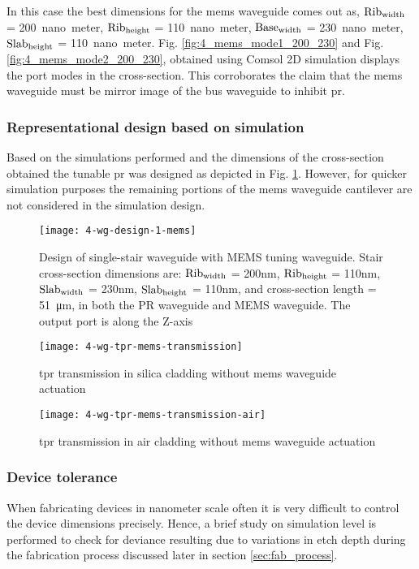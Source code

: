 \documentclass[../report.tex]{subfiles}
\begin{document}
In this case the best dimensions for the \gls{mems} waveguide comes out as, $\mathrm{Rib_{width}}$ = \SI{200}{nano meter}, $\mathrm{Rib_{height}}$ = \SI{110}{nano meter}, $\mathrm{Base_{width}}$ = \SI{230}{nano meter}, $\mathrm{Slab_{height}}$ = \SI{110}{nano meter}. Fig. \ref{fig:4_mems_mode1_200_230} and Fig. \ref{fig:4_mems_mode2_200_230}, obtained using Comsol 2D simulation displays the port modes in the cross-section. This corroborates the claim that the \gls{mems} waveguide must be mirror image of the bus waveguide to inhibit \gls{pr}.

\subsubsection{Representational design based on simulation}			
Based on the simulations performed and the dimensions of the cross-section obtained the tunable \gls{pr} was designed as depicted in Fig. \ref{fig:4_wg_design_1_mems}. However, for quicker simulation purposes the remaining portions of the \gls{mems} waveguide cantilever are not considered in the simulation design.  

\begin{figure}[H] %
	\centering
	\texttt{[image: 4-wg-design-1-mems]}
	\caption{Design of single-stair waveguide with MEMS tuning waveguide. Stair cross-section dimensions are: $\mathrm{Rib_{width}}$ = 200nm, $\mathrm{Rib_{height}}$ = 110nm, $\mathrm{Slab_{width}}$ = 230nm, $\mathrm{Slab_{height}}$ = 110nm, and cross-section length = \SI{51}{\micro\meter}, in both the PR waveguide and MEMS waveguide. The output port is along the Z-axis}
	\label{fig:4_wg_design_1_mems}
\end{figure}

\begin{figure}[H] %
	\centering
	\texttt{[image: 4-wg-tpr-mems-transmission]}
	\caption{\gls{tpr} transmission in silica cladding without \gls{mems} waveguide actuation}
	\label{fig:4_wg_tpr_mems_transmission}
\end{figure}

\begin{figure}[H] %
	\centering
	\texttt{[image: 4-wg-tpr-mems-transmission-air]}
	\caption{\gls{tpr} transmission in air cladding without \gls{mems} waveguide actuation}
	\label{fig:4_wg_tpr_mems_transmission_air}
\end{figure}

\subsubsection{Device tolerance}
When fabricating devices in nanometer scale often it is very difficult to control the device dimensions precisely. Hence, a brief study on simulation level is performed to check for deviance resulting due to variations in etch depth during the fabrication process discussed later in section \ref{sec:fab_process}.\\  
\end{document}
